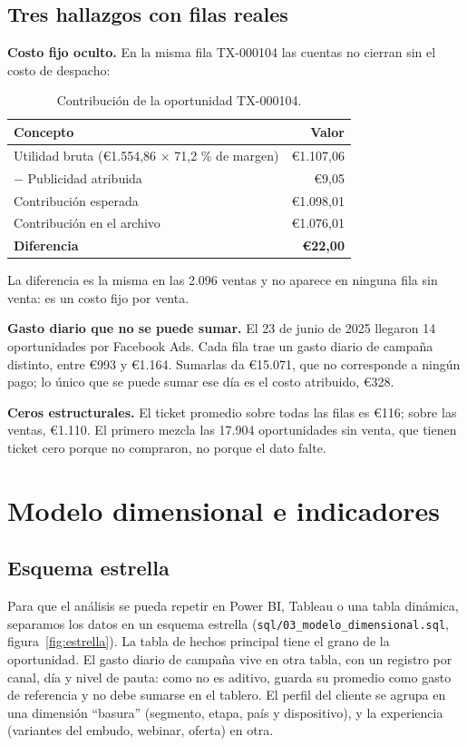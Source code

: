 \documentclass[11pt,letterpaper]{article}
\begin{document}
\subsection{Tres hallazgos con filas reales}

\textbf{Costo fijo oculto.} En la misma fila TX-000104 las cuentas no cierran sin el costo de despacho:

\begin{table}[!htbp]
\centering
\caption{Contribución de la oportunidad TX-000104.}
\begin{tabular}{l r}
\toprule
Concepto & Valor \\
\midrule
Utilidad bruta (€1.554,86 × 71,2 \% de margen) & €1.107,06 \\
$-$ Publicidad atribuida & €9,05 \\
Contribución esperada & €1.098,01 \\
Contribución en el archivo & €1.076,01 \\
\textbf{Diferencia} & \textbf{€22,00} \\
\bottomrule
\end{tabular}
\end{table}

La diferencia es la misma en las 2.096 ventas y no aparece en ninguna fila sin venta: es un costo fijo por venta.

\textbf{Gasto diario que no se puede sumar.} El 23 de junio de 2025 llegaron 14 oportunidades por Facebook Ads.
Cada fila trae un gasto diario de campaña distinto, entre €993 y €1.164. Sumarlas da €15.071, que no corresponde
a ningún pago; lo único que se puede sumar ese día es el costo atribuido, €328.

\textbf{Ceros estructurales.} El ticket promedio sobre todas las filas es €116; sobre las ventas, €1.110. El
primero mezcla las 17.904 oportunidades sin venta, que tienen ticket cero porque no compraron, no porque el dato
falte.

\section{Modelo dimensional e indicadores}

\subsection{Esquema estrella}

Para que el análisis se pueda repetir en Power BI, Tableau o una tabla dinámica, separamos los datos en un
esquema estrella (\texttt{sql/03\_modelo\_dimensional.sql}, figura~\ref{fig:estrella}). La tabla de hechos
principal tiene el grano de la oportunidad. El gasto diario de campaña vive en otra tabla, con un registro
por canal, día y nivel de pauta: como no es aditivo, guarda su promedio como gasto de referencia y no debe
sumarse en el tablero. El perfil del cliente
se agrupa en una dimensión ``basura'' (segmento, etapa, país y dispositivo), y la experiencia (variantes del
embudo, webinar, oferta) en otra.
\end{document}

